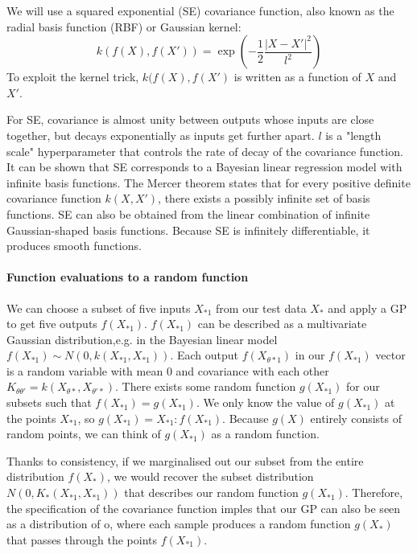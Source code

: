 \documentclass[10pt]{article}
\begin{document}
We will use a squared exponential (SE) covariance function, also known as the radial basis function (RBF) or Gaussian kernel:
\begin{equation*}
    k(f(X), f(X')) = \exp\left(-\frac{1}{2}\frac{|X - X'|^2}{l^2}\right)
\end{equation*}
To exploit the kernel trick, $k(f(X), f(X')$ is written as a function of $X$ and $X'$. 

For SE, covariance is almost unity between outputs whose inputs are close together, but decays exponentially as inputs get further apart. $l$ is a "length scale" hyperparameter that controls the rate of decay of the covariance function. It can be shown that SE corresponds to a Bayesian linear regression model with infinite basis functions. The Mercer theorem states that for every positive definite covariance function $k(X,X')$, there exists a possibly infinite set of basis functions. SE can also be obtained from the linear combination of infinite Gaussian-shaped basis functions. Because SE is infinitely differentiable, it produces smooth functions.

\paragraph{Function evaluations to a random function}
We can choose a subset of five inputs $X_{*1}$ from our test data $X_*$ and apply a GP to get five outputs $f(X_{*1})$. $f(X_{*1})$ can be described as a multivariate Gaussian distribution,e.g. in the Bayesian linear model $f(X_{*1}) \sim N(0, k(X_{*1}, X_{*1}))$. Each output $f(X_{\theta*1})$ in our $f(X_{*1})$ vector is a random variable with mean $0$ and covariance with each other $K_{\theta\theta'} = k(X_{\theta*}, X_{\theta'*})$. There exists some random function $g(X_{*1})$ for our subsets such that $f(X_{*1}) = g(X_{*1})$. We only know the value of $g(X_{*1})$ at the points $X_{*1}$, so $g(X_{*1}) = {X_{*1} : f(X_{*1})}$. Because $g(X)$ entirely consists of random points, we can think of $g(X_{*1})$ as a random function.
    
Thanks to consistency, if we marginalised out our subset from the entire distribution $f(X_*)$, we would recover the subset distribution $N(0, K_*(X_{*1}, X_{*1}))$ that describes our random function $g(X_{*1})$. Therefore, the specification of the covariance function imples that our GP can also be seen as a distribution of o, where each sample produces a random function $g(X_*)$ that passes through the points $f(X_{*1})$.
\end{document}
